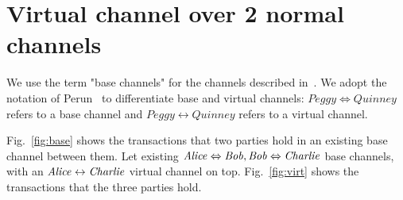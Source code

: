 \section{Virtual channel over 2 normal channels}
  We use the term "base channels" for the channels described
  in~\cite{lightning}. We adopt the notation of
  Perun~\cite{DBLP:conf/ccs/DziembowskiFH18} to differentiate base and virtual
  channels: $\mathit{Peggy} \Leftrightarrow \mathit{Quinney}$ refers to a base
  channel and $\mathit{Peggy} \leftrightarrow \mathit{Quinney}$ refers to a
  virtual channel.

  Fig.~\ref{fig:base} shows the transactions that two parties hold in an
  existing base channel between them. Let existing $\mathit{Alice} \Leftrightarrow \mathit{Bob},
  \mathit{Bob} \Leftrightarrow \mathit{Charlie}$ base channels, with an $\mathit{Alice} \leftrightarrow
  \mathit{Charlie}$ virtual channel on top. Fig.~\ref{fig:virt} shows the transactions
  that the three parties hold.

%    

